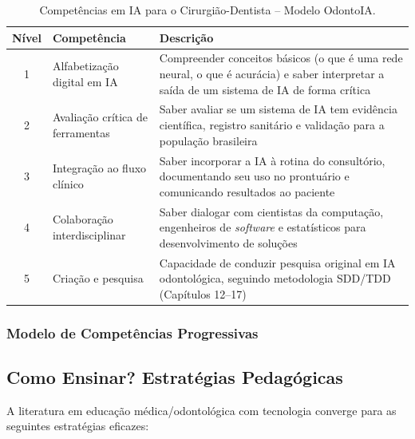 \begin{table}[H]
  \centering
  \caption{Competências em IA para o Cirurgião-Dentista -- Modelo OdontoIA.}
  \label{tab:competencias-ia}
  \begin{tabularx}{\textwidth}{clX}
    \toprule
    \textbf{Nível} & \textbf{Competência} & \textbf{Descrição} \\
    \midrule
    1 & Alfabetização digital em IA & Compreender conceitos básicos (o que é
      uma rede neural, o que é acurácia) e saber interpretar a saída de um
      sistema de IA de forma crítica \\
    2 & Avaliação crítica de ferramentas & Saber avaliar se um sistema de IA
      tem evidência científica, registro sanitário e validação para a população
      brasileira \\
    3 & Integração ao fluxo clínico & Saber incorporar a IA à rotina do
      consultório, documentando seu uso no prontuário e comunicando resultados
      ao paciente \\
    4 & Colaboração interdisciplinar & Saber dialogar com cientistas da
      computação, engenheiros de \textit{software} e estatísticos para
      desenvolvimento de soluções \\
    5 & Criação e pesquisa & Capacidade de conduzir pesquisa original em IA
      odontológica, seguindo metodologia SDD/TDD (Capítulos 12--17) \\
    \bottomrule
  \end{tabularx}
\end{table}

\subsubsection{Modelo de Competências Progressivas}


\subsection{Como Ensinar? Estratégias Pedagógicas}

A literatura em educação médica/odontológica com tecnologia converge para as
seguintes estratégias eficazes:

